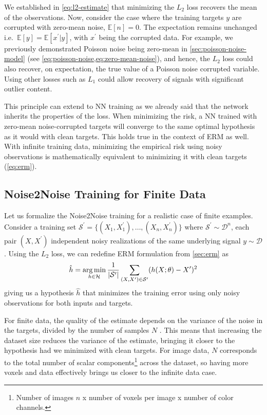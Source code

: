 We established in \cref{eq:l2-estimate} that minimizing the $L_2$ loss recovers the mean of the observations. Now, consider the case where the training targets $y$ are corrupted with zero-mean noise, $\mathbb{E}[n] = 0$. The expectation remains unchanged i.e.\ $\mathbb{E}[y] = \mathbb{E}[x^\prime|y]$, with $x^\prime$ being the corrupted data. For example, we previously demonstrated Poisson noise being zero-mean  in \cref{sec:poisson-noise-model} (see \cref{eq:poisson-noise,eq:zero-mean-noise}), and hence, the $L_2$ loss could also recover, on expectation, the true value of a Poisson noise corrupted variable. Using other losses such as $L_1$ could allow recovery of signals with significant outlier content.

This principle can extend to \gls{NN} training as we already said that the network inherits the properties of the loss. When minimizing the risk, a \gls{NN} trained with zero-mean noise-corrupted targets will converge to the same optimal hypothesis as it would with clean targets. This holds true in the context of \gls{ERM} as well. With infinite training data, minimizing the empirical risk using noisy observations is mathematically equivalent to minimizing it with clean targets (\cref{eq:erm}).

\subsection{Noise2Noise Training for Finite Data}
Let us formalize the Noise2Noise training for a realistic case of finite examples. Consider a training set $\mathcal{S}^\prime = \{(X_1, X_1^\prime), \dots, (X_n, X_n^\prime)\}$ where $\mathcal{S}^\prime \sim \mathcal{D}^n$, each pair $(X, X^\prime)$ independent noisy realizations of the same underlying signal $y \sim \mathcal{D}$. Using the $L_2$ loss, we can redefine \gls{ERM} formulation from \cref{sec:erm} as
\begin{equation}\label{eq:erm-noise2noise}
    \hat{h} = \operatorname*{arg\,min}_{h \in \mathcal{H}} \frac{1}{\lvert \mathcal{S^\prime} \rvert} \sum_{(X, X^\prime) \in \mathcal{S}^\prime} (h(X; \theta) - X^\prime)^2
\end{equation}
giving us a hypothesis $\hat{h}$ that minimizes the training error using only noisy observations for both inputs and targets.

For finite data, the quality of the estimate depends on the variance of the noise in the targets, divided by the number of samples $N$ \cite[supplementary~material]{lehtinenNoise2NoiseLearningImage2018}. This means that increasing the dataset size reduces the variance of the estimate, bringing it closer to the hypothesis had we minimized with clean targets. For image data, $N$ corresponds to the total number of scalar components\footnote{Number of images $n$ x number of voxels per image x number of color channels.} across the dataset, so having more voxels and data effectively brings us closer to the infinite data case.

